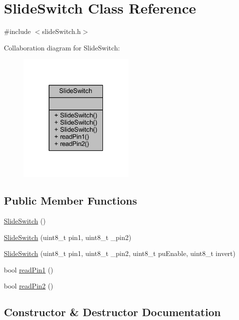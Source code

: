 \hypertarget{class_slide_switch}{}\section{Slide\+Switch Class Reference}
\label{class_slide_switch}


{\ttfamily \#include $<$slide\+Switch.\+h$>$}



Collaboration diagram for Slide\+Switch\+:\nopagebreak
\begin{figure}[H]
\begin{center}
\leavevmode
\includegraphics[width=163pt]{class_slide_switch__coll__graph}
\end{center}
\end{figure}
\subsection*{Public Member Functions}
\begin{DoxyCompactItemize}
\item 
\hyperlink{class_slide_switch_a5b0ed9a670728dd2619eacc48a53d25f}{Slide\+Switch} ()
\item 
\hyperlink{class_slide_switch_a00c9284ec86c53602afd988faacb02a6}{Slide\+Switch} (uint8\+\_\+t pin1, uint8\+\_\+t \+\_\+pin2)
\item 
\hyperlink{class_slide_switch_a0806b870d5fb6bfb22b82b6f0146795e}{Slide\+Switch} (uint8\+\_\+t pin1, uint8\+\_\+t \+\_\+pin2, uint8\+\_\+t pu\+Enable, uint8\+\_\+t invert)
\item 
bool \hyperlink{class_slide_switch_a5c9f61ec4369f17e176d948ad74fc3ab}{read\+Pin1} ()
\item 
bool \hyperlink{class_slide_switch_ada186df3375d7dcd7dac6470c9832830}{read\+Pin2} ()
\end{DoxyCompactItemize}


\subsection{Constructor \& Destructor Documentation}
\mbox{\label{class_slide_switch_a5b0ed9a670728dd2619eacc48a53d25f}} 
